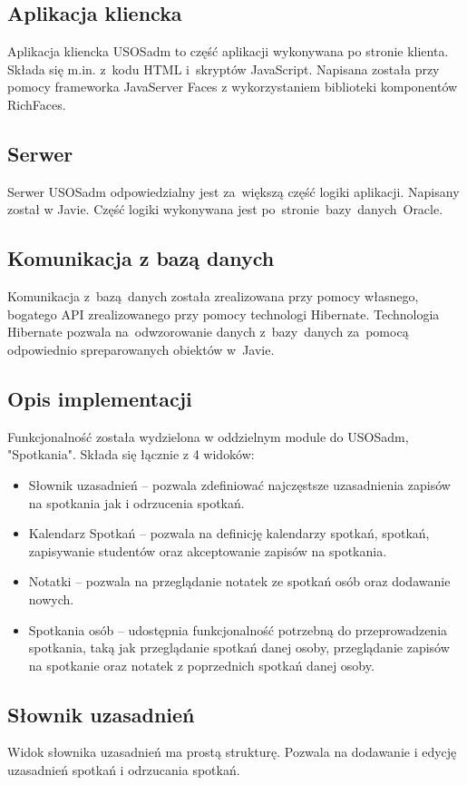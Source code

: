 \documentclass[licencjacka]{pracamgr}
\begin{document}
\subsection{Aplikacja kliencka}
Aplikacja kliencka USOSadm to część aplikacji wykonywana po stronie klienta. Składa się m.in. z~kodu HTML i~skryptów JavaScript. Napisana została przy pomocy frameworka JavaServer Faces z wykorzystaniem biblioteki komponentów RichFaces.

\subsection{Serwer}
Serwer USOSadm odpowiedzialny jest za~większą część logiki aplikacji. Napisany został w Javie. Część logiki wykonywana jest po~stronie~bazy~danych~Oracle.

\subsection{Komunikacja z bazą danych}
Komunikacja z~bazą~danych została zrealizowana przy pomocy własnego, bogatego API zrealizowanego przy pomocy technologi Hibernate. Technologia Hibernate pozwala na~odwzorowanie danych z~bazy~danych za~pomocą odpowiednio spreparowanych obiektów w~Javie.

\subsection{Opis implementacji}
Funkcjonalność została wydzielona w oddzielnym module do USOSadm, "Spotkania". Składa się łącznie z 4 widoków:
\begin{itemize}
\item Słownik uzasadnień -- pozwala zdefiniować najczęstsze uzasadnienia zapisów na spotkania jak i odrzucenia spotkań.
\item Kalendarz Spotkań -- pozwala na definicję kalendarzy spotkań, spotkań, zapisywanie studentów oraz akceptowanie zapisów na spotkania.
\item Notatki -- pozwala na przeglądanie notatek ze spotkań osób oraz dodawanie nowych.
\item Spotkania osób -- udostępnia funkcjonalność potrzebną do przeprowadzenia spotkania, taką jak przeglądanie spotkań danej osoby, przeglądanie zapisów na spotkanie oraz notatek z poprzednich spotkań danej osoby.
\end{itemize}

\subsection{Słownik uzasadnień}
Widok słownika uzasadnień ma prostą strukturę. Pozwala na dodawanie i edycję uzasadnień spotkań i odrzucania spotkań.
\end{document}
